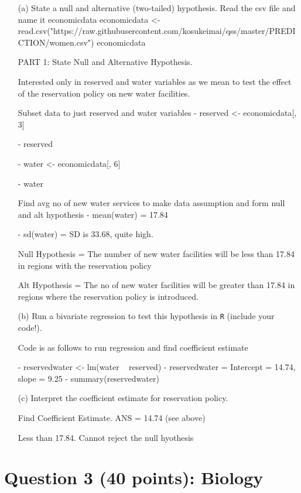 \documentclass[12pt,letterpaper]{article}
\begin{document}
\newpage
\begin{enumerate}
	\item [(a)] State a null and alternative (two-tailed) hypothesis. 
	 Read the csv file and name it economicdata
	economicdata <- read.csv("https://raw.githubusercontent.com/kosukeimai/qss/master/PREDICTION/women.csv")
	economicdata
	
	 PART 1: State Null and Alternative Hypothesis. 
	 
	 Interested only in reserved and water variables as we mean to test the effect of the reservation policy on new water facilities.
	
	Subset data to just reserved and water variables
	- reserved <- economicdata[, 3] 
	
	- reserved    
	
	- water <- economicdata[, 6]
	
	- water
	
	Find avg no of new water services to make data assumption and form null and alt hypothesis
	- mean(water) = 17.84
	
	- sd(water) = SD is 33.68, quite high.
	
	 Null Hypothesis = The number of new water facilities will be less than 17.84 in regions with the reservation policy
	
	Alt Hypothesis = The no of new water facilities will be greater than 17.84 in regions where the reservation policy is introduced.
	
	\vspace{6cm}
	\item [(b)] Run a bivariate regression to test this hypothesis in \texttt{R} (include your code!).

Code is as follows to run regression and find coefficient estimate

	- reservedwater <- lm(water ~ reserved)
	- reservedwater =  Intercept = 14.74, slope = 9.25
- 	summary(reservedwater)

	\vspace{6cm}
	\item [(c)] Interpret the coefficient estimate for reservation policy. 
	
	Find Coefficient Estimate. ANS = 14.74 (see above)
	
	Less than 17.84. Cannot reject the null hyothesis 
	
\end{enumerate}

\newpage
	\section*{Question 3 (40 points): Biology}
\end{document}
